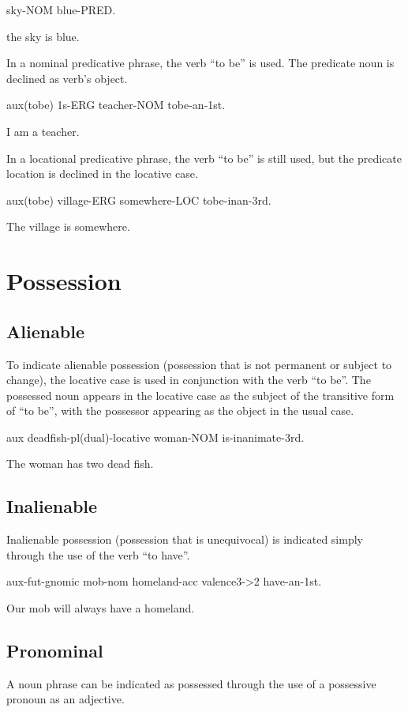 sky-NOM blue-PRED.

the sky is blue.

In a nominal predicative phrase, the verb ``to be'' is used. The predicate noun
is declined as verb's object.

aux(tobe) 1s-ERG teacher-NOM tobe-an-1st.

I am a teacher.

In a locational predicative phrase, the verb ``to be'' is still used, but the
predicate location is declined in the locative case.

aux(tobe) village-ERG somewhere-LOC tobe-inan-3rd.

The village is somewhere.

\section{Possession}

\subsection{Alienable}

To indicate alienable possession (possession that is not permanent or subject to
change), the locative case is used in conjunction with the verb ``to be''. The
possessed noun appears in the locative case as the subject of the transitive
form of ``to be'', with the possessor appearing as the object in the usual case.

aux deadfish-pl(dual)-locative woman-NOM is-inanimate-3rd.

The woman has two dead fish.

\subsection{Inalienable}

Inalienable possession (possession that is unequivocal) is indicated simply
through the use of the verb ``to have''.

aux-fut-gnomic mob-nom homeland-acc valence3->2 have-an-1st.

Our mob will always have a homeland.

\subsection{Pronominal}

A noun phrase can be indicated as possessed through the use of a possessive
pronoun as an adjective.

